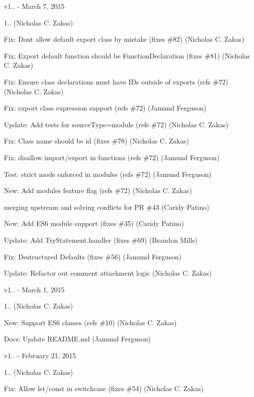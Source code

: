 v1.. -\/ March 7, 2015


\begin{DoxyItemize}
\item 1.. (Nicholas C. Zakas)
\item Fix\+: Don\textquotesingle{}t allow default export class by mistake (fixes \#82) (Nicholas C. Zakas)
\item Fix\+: Export default function should be Function\+Declaration (fixes \#81) (Nicholas C. Zakas)
\item Fix\+: Ensure class declarations must have I\+Ds outside of exports (refs \#72) (Nicholas C. Zakas)
\item Fix\+: export class expression support (refs \#72) (Jamund Ferguson)
\item Update\+: Add tests for source\+Type=module (refs \#72) (Nicholas C. Zakas)
\item Fix\+: Class name should be id (fixes \#78) (Nicholas C. Zakas)
\item Fix\+: disallow import/export in functions (refs \#72) (Jamund Ferguson)
\item Test\+: strict mode enforced in modules (refs \#72) (Jamund Ferguson)
\item New\+: Add modules feature flag (refs \#72) (Nicholas C. Zakas)
\item merging upstream and solving conflicts for PR \#43 (Caridy Patino)
\item New\+: Add E\+S6 module support (fixes \#35) (Caridy Patino)
\item Update\+: Add Try\+Statement.\+handler (fixes \#69) (Brandon Mills)
\item Fix\+: Destructured Defaults (fixes \#56) (Jamund Ferguson)
\item Update\+: Refactor out comment attachment logic (Nicholas C. Zakas)
\end{DoxyItemize}

v1.. -\/ March 1, 2015


\begin{DoxyItemize}
\item 1.. (Nicholas C. Zakas)
\item New\+: Support E\+S6 classes (refs \#10) (Nicholas C. Zakas)
\item Docs\+: Update R\+E\+A\+D\+M\+E.\+md (Jamund Ferguson)
\end{DoxyItemize}

v1.. -\/ February 21, 2015


\begin{DoxyItemize}
\item 1.. (Nicholas C. Zakas)
\item Fix\+: Allow let/const in switchcase (fixes \#54) (Nicholas C. Zakas)
\end{DoxyItemize}


